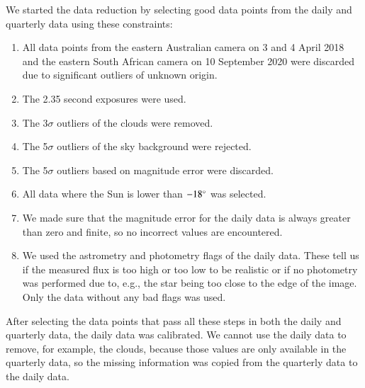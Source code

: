\documentclass{aa}
\begin{document}
We started the data reduction by selecting good data points from the daily and quarterly data using these constraints:

\begin{enumerate}
    \item All data points from the eastern Australian camera on 3 and 4 April 2018 and the eastern South African camera on 10 September 2020 were discarded due to significant outliers of unknown origin.
    \item The 2.35 second exposures were used.
    \item The 3$\sigma$ outliers of the clouds were removed. %
    \item The 5$\sigma$ outliers of the sky background were rejected. %
    \item The 5$\sigma$ outliers based on magnitude error were discarded. %
    \item All data where the Sun is lower than $-18^\circ$ was selected. %
    \item We made sure that the magnitude error for the daily data is always greater than zero and finite, so no incorrect values are encountered. 
    \item We used the astrometry and photometry flags of the daily data. 
    These tell us if the measured flux is too high or too low to be realistic or if no photometry was performed due to, e.g., the star being too close to the edge of the image.
    Only the data without any bad flags was used. 
\end{enumerate}

After selecting the data points that pass all these steps in both the daily and quarterly data, the daily data was calibrated.
%
We cannot use the daily data to remove, for example, the clouds, because those values are only available in the quarterly data, so the missing information was copied from the quarterly data to the daily data. 
\end{document}
